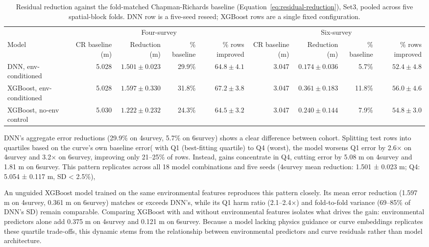 \begin{table}[!htbp]
\centering
\scriptsize
\setlength{\tabcolsep}{4pt}
\renewcommand{\arraystretch}{1.2}
\begin{tabular}{lrrrr rrrr}
\toprule
& \multicolumn{4}{c}{Four-survey} & \multicolumn{4}{c}{Six-survey} \\
\cmidrule(lr){2-5} \cmidrule(lr){6-9}
Model & CR baseline (m) & Reduction (m) & \% baseline & \% rows improved & CR baseline (m) & Reduction (m) & \% baseline & \% rows improved \\
\midrule
DNN, env-conditioned & 5.028 & $1.501{\pm}0.023$ & 29.9\% & $64.8{\pm}4.1$ & 3.047 & $0.174{\pm}0.036$ & 5.7\% & $52.4{\pm}4.8$ \\
XGBoost, env-conditioned & 5.028 & $1.597{\pm}0.330$ & 31.8\% & $67.2{\pm}3.8$ & 3.047 & $0.361{\pm}0.183$ & 11.8\% & $56.0{\pm}4.6$ \\
XGBoost, no-env control & 5.030 & $1.222{\pm}0.232$ & 24.3\% & $64.5{\pm}3.2$ & 3.047 & $0.240{\pm}0.144$ & 7.9\% & $54.8{\pm}3.0$ \\
\bottomrule
\end{tabular}
\caption{Residual reduction against the fold-matched Chapman-Richards baseline
(Equation~\ref{eq:residual-reduction}), Set3, pooled across five spatial-block folds.
DNN row is a five-seed reseed; XGBoost rows are a single fixed configuration.}
\label{tab:results-rq2a} %
\end{table}

DNN’s aggregate error reductions (29.9\% on 4survey, 5.7\% on 6survey) shows a clear difference between cohort. Splitting test rows into quartiles based on the curve's own baseline error( with Q1 (best-fitting
quartile) to Q4 (worst), the model worsens Q1 error by 2.6× on 4survey and 3.2× on 6survey, improving only 21–25\% of rows. Instead, gains concentrate in Q4, cutting error by 5.08 m on 4survey and 1.81 m on 6survey. This pattern replicates across all 18 model combinations and five seeds (4survey mean reduction: 1.501 ± 0.023 m; Q4: 5.054 ± 0.117 m, SD < 2.5\%), 

An unguided XGBoost model trained on the same environmental features reproduces this pattern closely. Its mean error reduction (1.597 m on 4survey, 0.361 m on 6survey) matches or exceeds DNN's, while its Q1 harm ratio (2.1–2.4×) and fold-to-fold variance (69–85\% of DNN's SD) remain comparable. Comparing XGBoost with and without environmental features isolates what drives the gain: environmental predictors alone add 0.375 m on 4survey and 0.121 m on 6survey. Because a model lacking physics guidance or curve embeddings replicates these quartile trade-offs, this dynamic stems from the relationship between environmental predictors and curve residuals rather than model architecture. 

